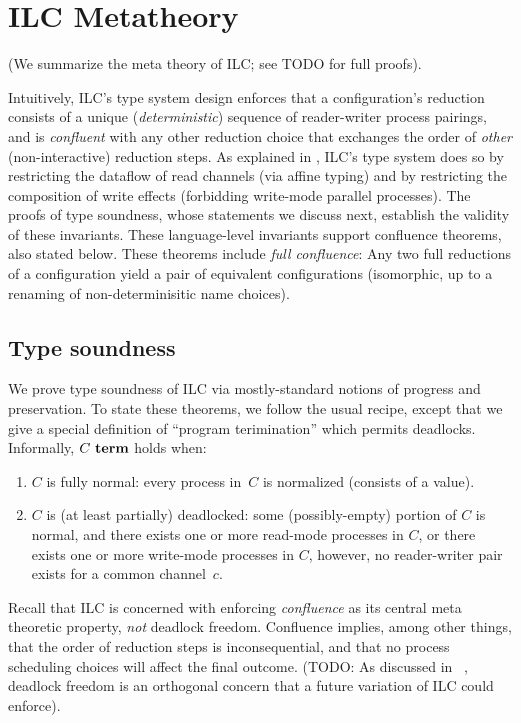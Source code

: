\section{ILC Metatheory}
\label{sec:metatheory}

(We summarize the meta theory of ILC; see TODO for full proofs).

Intuitively, ILC's type system design enforces that a
configuration's reduction consists of a unique
(\emph{deterministic}) sequence of reader-writer process pairings,
and is \emph{confluent} with any other reduction choice that exchanges 
the order of \emph{other} (non-interactive) reduction steps.
%
As explained in , 
ILC's type system does so by restricting the dataflow of read channels
(via affine typing) 
and by restricting the composition of write effects 
(forbidding write-mode parallel processes).
%
The proofs of type soundness, whose statements we discuss next, 
establish the validity of these invariants.
%
These language-level invariants support confluence theorems, also
stated below.
%
These theorems include \emph{full confluence}:
Any two full reductions of a configuration yield a pair of equivalent configurations
(isomorphic, up to a renaming of non-determinisitic name choices).

\subsection{Type soundness}

We prove type soundness of ILC via mostly-standard notions of progress
and preservation.
%
To state these theorems, we follow the usual recipe, except that we
give a special definition of ``program terimination'' which permits
deadlocks.
%
Informally, $C~\textbf{term}$ holds when:
\begin{enumerate}
 \item $C$ is fully normal: every process in~$C$  
   is normalized (consists of a value).
 \item $C$ is (at least partially) deadlocked: 
   some (possibly-empty) portion of $C$ is normal, and
   there exists one or more read-mode processes in $C$, or
   there exists one or more write-mode processes in $C$,
   however, no reader-writer pair exists for a common channel~$c$.
\end{enumerate}

Recall that ILC is concerned with enforcing \emph{confluence} as its
central meta theoretic property, \emph{not} deadlock freedom.
%
Confluence implies, among other things, that the order of reduction steps is
inconsequential, and that no process scheduling choices will affect
the final outcome.
%
(TODO: As discussed in ~, deadlock freedom is an
orthogonal concern that a future variation of ILC could enforce).

